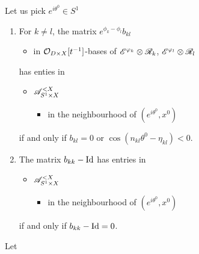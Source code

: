 \begin{lem}
  Let us pick $e^{i\theta^0}\in S^1$
  \begin{enumerate}
    \item For $k\neq l$, the matrix $e^{\phi_k-\phi_l}b_{kl}$
      \begin{itemize}
        \item in $\mathcal{O}_{D\times X}[t^{-1}]$-bases of $\mathscr{E}^{\varphi_k}\otimes\mathscr{R}_k$,
          $\mathscr{E}^{\varphi_l}\otimes\mathscr{R}_l$
      \end{itemize}
      has enties in
      \begin{itemize}
        \item $\mathscr{A}_{S^1\times X}^{<X}$
          \begin{itemize}
            \item in the neighbourhood of $(e^{i\theta^0},x^0)$
          \end{itemize}
      \end{itemize}
      if and only if $b_{kl}=0$ or
      $\cos(n_{kl}\theta^0-\eta_{kl})<0$.
    \item The matrix $b_{kk}-\operatorname{Id}$ has entries in
      \begin{itemize}
        \item $\mathscr{A}_{S^1\times X}^{<X}$
          \begin{itemize}
            \item in the neighbourhood of $(e^{i\theta^0},x^0)$
          \end{itemize}
      \end{itemize}
      if and only if $b_{kk}-\operatorname{Id}=0$.
  \end{enumerate}
  \begin{comment}
    \begin{proof}[Proofsketch]
      For the first point, it is enough to check that $e^{\phi_k-\phi_l}$
      belongs to $\sA_{S^1\times X}^{<X}$ in the neighbourhood of
      $(e^{i\theta^0},x^0)$ if and only if $\Re(\phi_k-\phi_l)<0$ on a
      sufficiently small neighbourhood of $(e^{i\theta^0},x^0)$, then to
      express this condition on the leading term of $\phi_k-\phi_l$.  Then, one
      notices that, as $b_{kl}$ has moderate growth, it does not affect the
      rapid decay or the exponential growth property.
    \end{proof}
  \end{comment}
\end{lem}
Let
